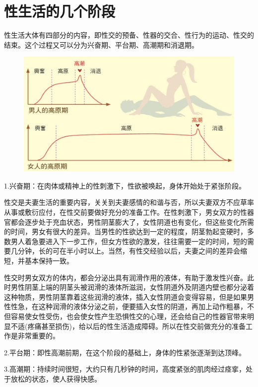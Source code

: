 \documentclass[12pt,UTF8]{ctexbook}
\begin{document}
\chapter{性生活的几个阶段}

性生活大体有四部分的内容，即性交的预备、性器的交合、性行为的运动、性交的结束。这个过程又可以分为兴奋期、平台期、高潮期和消退期。

\begin{figure}[htbp]
	\includegraphics[width=1\linewidth]{6}
	\caption{}
	\label{fig:1}
\end{figure}

1.兴奋期：在肉体或精神上的性刺激下，性欲被唤起，身体开始处于紧张阶段。

性交是夫妻生活的重要内容，关关到夫妻感情的和谐与否，所以夫妻双方不应草率从事或敷衍应付，在性交前要做好充分的准备工作。在性刺激下，男女双方的性器官都会逐步处于充血状态，男性阴茎膨大了，女性阴道也有变化，但这些变化所需的时间，男女有很大的差异。当男性的性欲达到一定的程度，阴茎勃起变硬时，多数男人着急要进入下一步工作，但女方性欲的激发，往往需要一定的时间，短的需要几分钟，长的可在半小时以上。当然，有性交经验以后，夫妻之间的差异会缩短，并基本保持一致。

性交时男女双方的体内，都会分泌出具有润滑作用的液体，有助于激发性兴奋。此时男性阴茎上端的阴茎头被润滑的液体所滋润，女性阴道外及阴道内壁也都分泌着这种物质，男性阴茎靠着这些润滑的液体，插入女性阴道会变得容易，但是如果男性性急，在这种润滑的液体分泌之前，便要插入女性的阴道，再加上动作粗暴，不但容易使女性受伤，也会使女性产生恐惧性交的心理，还会给自己的性器官带来明显不适(疼痛甚至损伤)，给以后的性生活造成障碍。所以在性交前做充分的准备工作是非常重要的。

2.平台期：即性高潮前期，在这个阶段的基础上，身体的性紧张逐渐到达顶峰。

3.高潮期：持续时间很短，大约只有几秒钟的时间，高度紧张的肌肉经过痉挛，处于放松的状态，使人获得快感。
\end{document}
